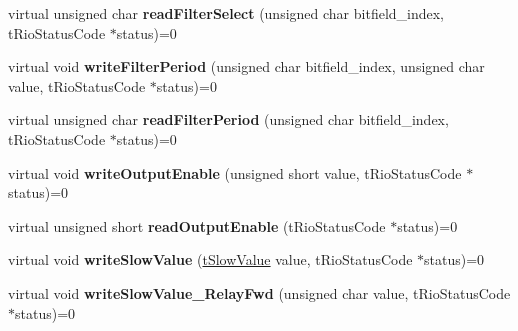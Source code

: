\begin{DoxyCompactItemize}
\item 
\hypertarget{classnFPGA_1_1nFRC__2012__1__6__4_1_1tDIO_a79d79300a71ef4e8c8bd5a97b3e95f91}{
virtual unsigned char {\bfseries readFilterSelect} (unsigned char bitfield\_\-index, tRioStatusCode $\ast$status)=0}
\label{classnFPGA_1_1nFRC__2012__1__6__4_1_1tDIO_a79d79300a71ef4e8c8bd5a97b3e95f91}

\item 
\hypertarget{classnFPGA_1_1nFRC__2012__1__6__4_1_1tDIO_afcda7c74d0283901bc0452b1b1ac1efb}{
virtual void {\bfseries writeFilterPeriod} (unsigned char bitfield\_\-index, unsigned char value, tRioStatusCode $\ast$status)=0}
\label{classnFPGA_1_1nFRC__2012__1__6__4_1_1tDIO_afcda7c74d0283901bc0452b1b1ac1efb}

\item 
\hypertarget{classnFPGA_1_1nFRC__2012__1__6__4_1_1tDIO_ab90d3e87c5800be8fb6a664c6a07388c}{
virtual unsigned char {\bfseries readFilterPeriod} (unsigned char bitfield\_\-index, tRioStatusCode $\ast$status)=0}
\label{classnFPGA_1_1nFRC__2012__1__6__4_1_1tDIO_ab90d3e87c5800be8fb6a664c6a07388c}

\item 
\hypertarget{classnFPGA_1_1nFRC__2012__1__6__4_1_1tDIO_a3cc2e20ea09045cf9df58ebdac1c32c5}{
virtual void {\bfseries writeOutputEnable} (unsigned short value, tRioStatusCode $\ast$status)=0}
\label{classnFPGA_1_1nFRC__2012__1__6__4_1_1tDIO_a3cc2e20ea09045cf9df58ebdac1c32c5}

\item 
\hypertarget{classnFPGA_1_1nFRC__2012__1__6__4_1_1tDIO_a782415ce6550b949fdf2169cb6858804}{
virtual unsigned short {\bfseries readOutputEnable} (tRioStatusCode $\ast$status)=0}
\label{classnFPGA_1_1nFRC__2012__1__6__4_1_1tDIO_a782415ce6550b949fdf2169cb6858804}

\item 
\hypertarget{classnFPGA_1_1nFRC__2012__1__6__4_1_1tDIO_a3b3935530d79059760cc0a6a4f2d330f}{
virtual void {\bfseries writeSlowValue} (\hyperlink{unionnFPGA_1_1nFRC__2012__1__6__4_1_1tDIO_1_1tSlowValue}{tSlowValue} value, tRioStatusCode $\ast$status)=0}
\label{classnFPGA_1_1nFRC__2012__1__6__4_1_1tDIO_a3b3935530d79059760cc0a6a4f2d330f}

\item 
\hypertarget{classnFPGA_1_1nFRC__2012__1__6__4_1_1tDIO_ae8c28fe388ec593cd775fc6b124b5967}{
virtual void {\bfseries writeSlowValue\_\-RelayFwd} (unsigned char value, tRioStatusCode $\ast$status)=0}
\label{classnFPGA_1_1nFRC__2012__1__6__4_1_1tDIO_ae8c28fe388ec593cd775fc6b124b5967}


\end{DoxyCompactItemize}
